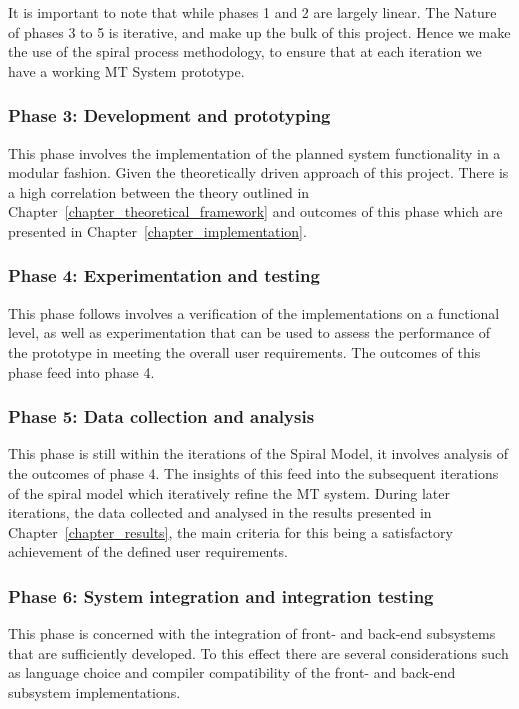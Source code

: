 It is important to note that while phases 1 and 2 are largely linear. The Nature
of phases 3 to 5 is iterative, and make up the bulk of this project. Hence we
make the use of the spiral process methodology, to ensure that at each iteration
we have a working MT System prototype.  

\subsubsection{Phase 3: Development and prototyping}
This phase involves the implementation of the planned system functionality in a
modular fashion. Given the theoretically driven approach of this project. There
is a high correlation between the theory outlined in
Chapter~\ref{chapter_theoretical_framework} and outcomes of this phase which are
presented in Chapter~\ref{chapter_implementation}.

\subsubsection{Phase 4: Experimentation and testing}
This phase follows involves a verification of the implementations on a
functional level, as well as experimentation that can be used to assess the
performance of the prototype in meeting the overall user requirements. The
outcomes of this phase feed into phase 4. 

\subsubsection{Phase 5: Data collection and analysis}
This phase is still within the iterations of the Spiral Model, it involves
analysis of the outcomes of phase 4. The insights of this feed into the 
subsequent iterations of the spiral model which iteratively refine the MT
system. 
During later iterations, the data collected and analysed in the results
presented in 
Chapter~\ref{chapter_results}, the main criteria for this being a satisfactory achievement
of the defined user requirements.

\subsubsection{Phase 6: System integration and integration testing}
This phase is concerned with the integration of front- and back-end subsystems that
are sufficiently developed. To this effect there are several considerations such
as language choice and compiler compatibility of the front- and back-end
subsystem implementations. 

